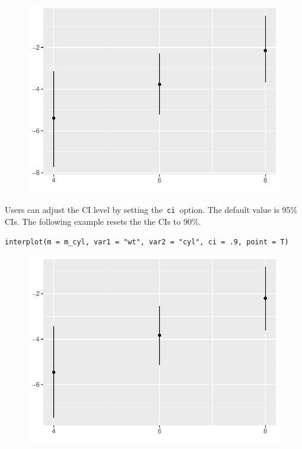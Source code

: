 \documentclass[
  article]{jss}
\begin{document}
\begin{figure}[H]

{\centering \includegraphics{jss_manuscript_files/figure-pdf/unnamed-chunk-4-1.pdf}

}

\end{figure}

Users can adjust the CI level by setting the~\texttt{ci}~option. The
default value is 95\% CIs. The following example resets the the CIs to
90\%.

\begin{verbatim}
interplot(m = m_cyl, var1 = "wt", var2 = "cyl", ci = .9, point = T)
\end{verbatim}

\begin{figure}[H]

{\centering \includegraphics{jss_manuscript_files/figure-pdf/unnamed-chunk-5-1.pdf}

}

\end{figure}
\end{document}
